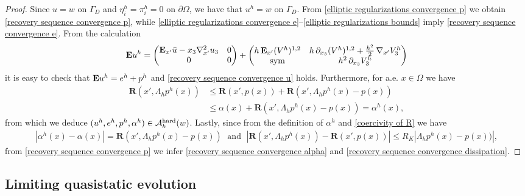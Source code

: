 \documentclass[reqno,10pt]{amsart}
\numberwithin{equation}{section}
\theoremstyle{remark}
\newcommand{\calA}{\mathcal{A}}
\DeclareMathOperator{\sym}{sym}
\newcommand{\Dir}{D}
\newcommand{\E}{{\bf E}}
\newcommand{\D}{\nabla}
\newcommand{\disspot}{\mathbf{R}}
\begin{document}
\begin{proof}
Since $u = w$ on $\Gamma_\Dir$ and $\eta^h_i = \pi^h_i = 0$ on $\partial\Omega$, we have that $u^h = w$  on $\Gamma_\Dir$.
From \eqref{elliptic regularizations convergence p} we obtain \eqref{recovery sequence convergence p}, while \eqref{elliptic regularizations convergence e}--\eqref{elliptic regularizations bounds} imply \eqref{recovery sequence convergence e}.
From the calculation
\begin{equation*}
	{\E}u^h = \begin{pmatrix} {\E}_{x'}\bar{u} - x_3 {\D}^2_{x'}u_3 & 0 \\ 0 & 0 \end{pmatrix} + \begin{pmatrix} h\,{\E}_{x'}(V^h)^{1,2} & h\,\partial_{x_3}(V^h)^{1,2} + \frac{h^2}{2}\,\nabla_{x'}V^h_3 \\ \sym & h^2\,\partial_{x_3}V^h_3 \end{pmatrix}
\end{equation*}
it is easy to check that ${\E}u^h = e^h+p^h$ and \eqref{recovery sequence convergence u} holds. 
Furthermore, for a.e. $x \in \Omega$ we have 
\begin{align*}
	\disspot(x', \Lambda_h p^h(x))
	& \leq \disspot(x',p(x)) + \disspot(x', \Lambda_h p^h(x) - p(x)) 
	\\& \leq \alpha(x) + \disspot(x', \Lambda_h p^h(x) - p(x)) 
	= \alpha^h(x),
\end{align*}
from which we deduce $(u^h, e^h, p^h, \alpha^h) \in \calA_{h}^{\rm hard}(w)$.
Lastly, since from the definition of $\alpha^h$ and \eqref{coercivity of R} we have
\begin{align*}
	| \alpha^h(x) - \alpha(x) | = \disspot(x', \Lambda_h p^h(x) - p(x)) \;\text{ and }\; | \disspot(x', \Lambda_h p^h(x)) - \disspot(x', p(x)) | \leq R_K | \Lambda_h p^h(x) - p(x)) |,
\end{align*}
from \eqref{recovery sequence convergence p} we infer \eqref{recovery sequence convergence alpha} and \eqref{recovery sequence convergence dissipation}.
\end{proof}

\subsection{Limiting quasistatic evolution} \label{seclimquasiev} 
\end{document}
